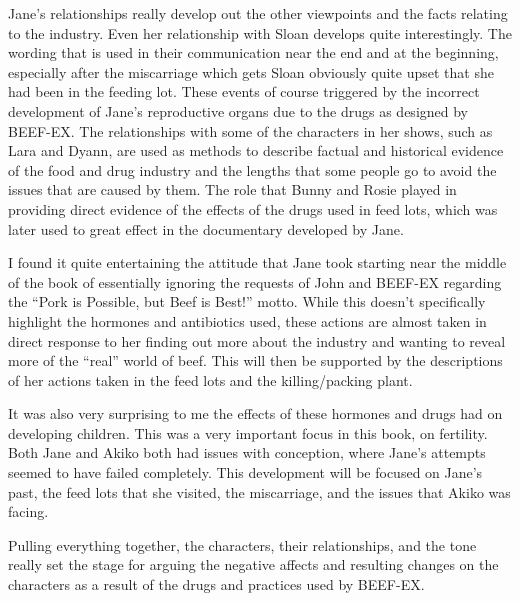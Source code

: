 \documentclass{article}
\begin{document}
Jane's relationships really develop out the other viewpoints and the facts
relating to the industry. Even her relationship with Sloan develops quite
interestingly. The wording that is used in their communication near the end
and at the beginning, especially after the miscarriage which gets Sloan
obviously quite upset that she had been in the feeding lot. These events of
course triggered by the incorrect development of Jane's reproductive organs
due to the drugs as designed by BEEF-EX. The relationships with some of the
characters in her shows, such as Lara and Dyann, are used as methods to
describe factual and historical evidence of the food and drug industry and
the lengths that some people go to avoid the issues that are caused by them.
The role that Bunny and Rosie played in providing direct evidence of the
effects of the drugs used in feed lots, which was later used to great effect
in the documentary developed by Jane.

I found it quite entertaining the attitude that Jane took starting near the
middle of the book of essentially ignoring the requests of John and BEEF-EX
regarding the ``Pork is Possible, but Beef is Best!'' \cite{ozeki1998my}
motto. While this doesn't specifically highlight the hormones and
antibiotics used, these actions are almost taken in direct response to her
finding out more about the industry and wanting to reveal more of the
``real'' world of beef. This will then be supported by the descriptions of
her actions taken in the feed lots and the killing/packing plant.

It was also very surprising to me the effects of these hormones and drugs
had on developing children. This was a very important focus in this book, on
fertility. Both Jane and Akiko both had issues with conception, where Jane's
attempts seemed to have failed completely. This development will be focused
on Jane's past, the feed lots that she visited, the miscarriage, and the
issues that Akiko was facing.

Pulling everything together, the characters, their relationships, and the
tone really set the stage for arguing the negative affects and resulting
changes on the characters as a result of the drugs and practices used by
BEEF-EX.
\makeworkscited
\end{document}

